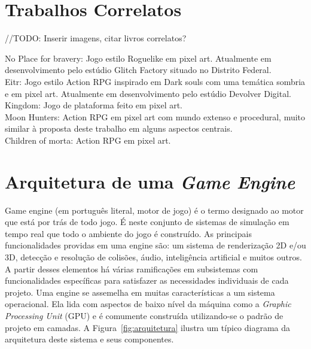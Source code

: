 \documentclass[12pt, 
openright, 
oneside, 
a4paper,    
brazil]{facom-ufu-abntex2}
\begin{document}
\fi

\chapter{Trabalhos Correlatos}
\label{sec:trabcorr}

//TODO: Inserir imagens, citar livros correlatos?

No Place for bravery: Jogo estilo Roguelike em pixel art. Atualmente em desenvolvimento pelo estúdio Glitch Factory situado no Distrito Federal.\\

Eitr: Jogo estilo Action RPG inspirado em Dark souls com uma temática sombria e em pixel art. Atualmente em desenvolvimento pelo estúdio Devolver Digital.\\

Kingdom: Jogo de plataforma feito em pixel art. \\

Moon Hunters: Action RPG em pixel art com mundo extenso e procedural, muito similar à proposta deste trabalho em alguns aspectos centrais. \\

Children of morta: Action RPG em pixel art. \\



\chapter{Arquitetura de uma \textit{Game Engine}}
Game engine (em português literal, motor de jogo) é o termo designado ao motor que está por trás de todo jogo. É neste conjunto de sistemas de simulação em tempo real que todo o ambiente do jogo é construído. As principais funcionalidades providas em uma engine são: um sistema de renderização 2D e/ou 3D, detecção e resolução de colisões, áudio, inteligência artificial e muitos outros. A partir desses elementos há várias ramificações em subsistemas com funcionalidades específicas para satisfazer as necessidades individuais de cada projeto. Uma engine se assemelha em muitas características a um sistema operacional. Ela lida com aspectos de baixo nível da máquina como a \textit{Graphic Processing Unit} (GPU) e é comumente construída utilizando-se o padrão de projeto em camadas. A Figura~\ref{fig:arquitetura}  ilustra um típico diagrama da arquitetura deste sistema e seus componentes.
\end{document}
